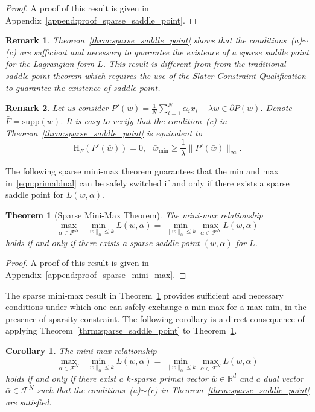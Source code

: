 \documentclass[11pt]{article}
\newtheorem{theorem}{Theorem}
\newtheorem{corollary}{Corollary}
\newtheorem{remark}{Remark}
\newcommand{\supp}{\text{supp}}
\numberwithin{equation}{section}
\numberwithin{table}{section}
\numberwithin{figure}{section}
\begin{document}
\begin{proof}
A proof of this result is given in Appendix~\ref{append:proof_sparse_saddle_point}.
\end{proof}
\begin{remark}
Theorem~\ref{thrm:sparse_saddle_point} shows that the conditions~(a)$\sim$(c) are sufficient and necessary to guarantee the existence of a sparse saddle point for the Lagrangian form $L$. This result is different from from the traditional saddle point theorem which requires the use of the Slater Constraint Qualification to guarantee the existence of saddle point.
\end{remark}
\begin{remark}
Let us consider $P'(\bar w)=\frac{1}{N}\sum_{i=1}^N \bar\alpha_i x_i + \lambda \bar w \in \partial P(\bar w)$. Denote $\bar F = \supp(\bar w)$. It is easy to verify that the condition~(c) in Theorem~\ref{thrm:sparse_saddle_point} is equivalent to
\[
\mathrm{H}_{\bar F}(P'(\bar w)) =0, \ \ \ \bar w_{\min} \ge \frac{1}{\lambda}\|P'(\bar w)\|_\infty.
\]
\end{remark}

The following sparse mini-max theorem guarantees that the min and max in~\eqref{eqn:primaldual} can be safely switched if and only if there exists a sparse saddle point for $L(w,\alpha)$.
\begin{theorem}[Sparse Mini-Max Theorem]\label{thrm:sparse_mini_max}
The mini-max relationship
\begin{equation}\label{equat:mini-max}
\max_{\alpha \in \mathcal{F}^N} \min_{\|w\|_0\le k} L(w, \alpha) =\min_{\|w\|_0\le k}\max_{\alpha \in \mathcal{F}^N} L(w,\alpha)
\end{equation}
holds if and only if there exists a sparse saddle point $(\bar w, \bar \alpha)$ for $L$.
\end{theorem}
\begin{proof}
A proof of this result is given in Appendix~\ref{append:proof_sparse_mini_max}.
\end{proof}
The sparse mini-max result in Theorem~\ref{thrm:sparse_mini_max} provides sufficient and necessary conditions under which one can safely exchange a min-max for a max-min, in the presence of sparsity constraint. The following corollary is a direct consequence of applying Theorem~\ref{thrm:sparse_saddle_point} to Theorem~\ref{thrm:sparse_mini_max}.
\begin{corollary}\label{corol:sparse_mini_max}
The mini-max relationship
\[
\max_{\alpha \in \mathcal{F}^N} \min_{\|w\|_0\le k} L(w, \alpha) =\min_{\|w\|_0\le k}\max_{\alpha \in \mathcal{F}^N} L(w,\alpha)
\]
holds if and only if there exist a $k$-sparse primal vector $\bar w \in \mathbb{R}^d$ and a dual vector $\bar \alpha \in \mathcal{F}^N$ such that the conditions~(a)$\sim$(c) in Theorem~\ref{thrm:sparse_saddle_point} are satisfied.
\end{corollary}
\end{document}

